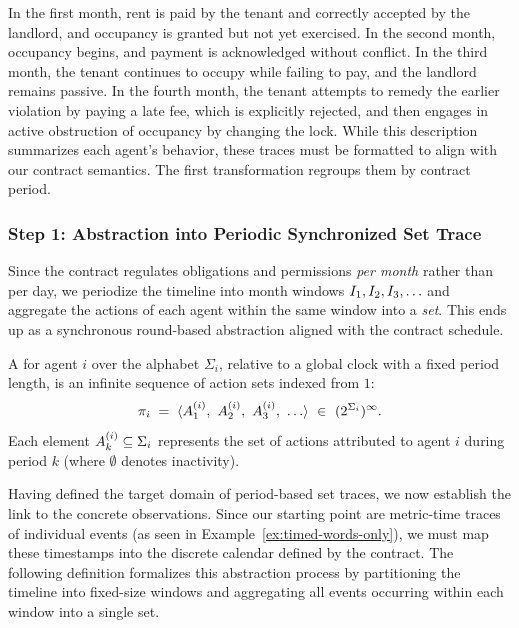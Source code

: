  In the first month, rent is paid by the tenant and correctly accepted by the landlord, and occupancy is granted but not yet exercised. In the second month, occupancy begins, and payment is acknowledged without conflict.
 In the third month, the tenant continues to occupy while failing to pay, and the landlord remains passive.
 In the fourth month, the tenant attempts to remedy the earlier violation by paying a late fee, which is explicitly rejected, and then engages in active obstruction of occupancy by changing the lock.
 While this description summarizes each agent's behavior, these traces must be formatted to align with our contract semantics. The first transformation regroups them by contract period.
 \subsubsection{Step 1: Abstraction into Periodic Synchronized Set Trace}
 Since the contract regulates obligations and permissions \emph{per month} rather than per day, we periodize
 the timeline into month windows $I_{1},I_{2},I_{3},\ldots$ and aggregate the actions of each agent
 within the same window into a \emph{set}. This ends up as a synchronous round-based abstraction aligned with the contract schedule.


\begin{definition}\label{def:periodic}
  A  for agent $i$ over the alphabet $\Sigma_i$, relative to a global clock with a fixed period length, is an infinite sequence of action sets indexed from $1$:
  \[
  \pi_i \;=\; \trace{\Aik{i}{1},\ \Aik{i}{2},\ \Aik{i}{3},\ \dots}
  \ \in\ (2^{\Sigma_i})^{\infty}.
  \]
  Each element $A^{(i)}_{k}\subseteq \Sigma_i$ represents the set of actions attributed to agent $i$ during period $k$ (where $\emptyset$ denotes inactivity).
  \end{definition}

\noindent Having defined the target domain of period-based set traces, we now establish the link to the concrete observations.
Since our starting point are metric-time traces of individual events (as seen in Example~\ref{ex:timed-words-only}), we must map these timestamps into the discrete calendar defined by the contract.
The following definition formalizes this abstraction process by partitioning the timeline into fixed-size windows and aggregating all events occurring within each window into a single set.
  

